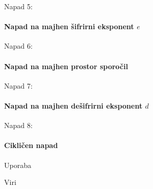 \documentclass[a4paper, 12pt]{beamer} %
\begin{document}
\begin{frame}{Napad 5:}
 \framesubtitle{Napad na majhen šifrirni eksponent $e$}
\end{frame}

\begin{frame}{Napad 6:}
\framesubtitle{Napad na majhen prostor sporočil}
\end{frame}

\begin{frame}{Napad 7:}
\framesubtitle{Napad na majhen dešifrirni eksponent $d$}
\end{frame}

\begin{frame}{Napad 8:}
\framesubtitle{Cikličen napad}
\end{frame}

\begin{frame}{Uporaba}
\end{frame}

\begin{frame}{Viri}
\end{frame}
\end{document}
